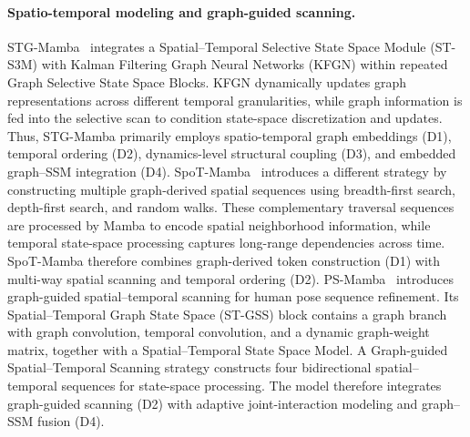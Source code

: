 \documentclass[acmsmall]{acmart}
\begin{document}
\paragraph{\textbf{Spatio-temporal modeling and graph-guided scanning.}}
STG-Mamba~\cite{li2024stg} integrates a Spatial--Temporal Selective State Space Module (ST-S3M) with Kalman Filtering Graph Neural Networks (KFGN) within repeated Graph Selective State Space Blocks. KFGN dynamically updates graph representations across different temporal granularities, while graph information is fed into the selective scan to condition state-space discretization and updates. Thus, STG-Mamba primarily employs spatio-temporal graph embeddings (D1), temporal ordering (D2), dynamics-level structural coupling (D3), and embedded graph--SSM integration (D4).
SpoT-Mamba~\cite{choi2024spot} introduces a different strategy by constructing
multiple graph-derived spatial sequences using breadth-first search,
depth-first search, and random walks. These complementary traversal sequences
are processed by Mamba to encode spatial neighborhood information, while
temporal state-space processing captures long-range dependencies across time.
SpoT-Mamba therefore combines graph-derived token construction (D1) with
multi-way spatial scanning and temporal ordering (D2).
PS-Mamba~\cite{dong2025ps} introduces graph-guided spatial--temporal scanning for human pose
sequence refinement. Its Spatial--Temporal Graph State Space (ST-GSS) block
contains a graph branch with graph convolution, temporal convolution, and a
dynamic graph-weight matrix, together with a Spatial--Temporal State Space
Model. A Graph-guided Spatial--Temporal Scanning strategy constructs four
bidirectional spatial--temporal sequences for state-space processing. The
model therefore integrates graph-guided scanning (D2) with adaptive
joint-interaction modeling and graph--SSM fusion (D4).
\end{document}

